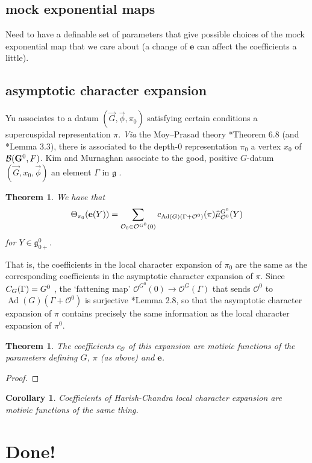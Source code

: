 \documentclass[12pt]{amsart}
\newcommand{\bG}{\mathbf{G}}
\newcommand{\cO}{\mathcal{O}}
\newcommand{\fg}{\mathfrak{g}}
\newcommand{\Ad}{\operatorname{Ad}}
\newcommand{\mexp}{\mathbf{e}}
\def\cO{\mathcal{O}}
\theoremstyle{plain}
\newtheorem{theorem}[thm]{Theorem}
\newtheorem{cor}[thm]{Corollary}
\theoremstyle{definition}
\begin{document}
\subsection{mock exponential maps}
Need to have a definable set of parameters that give possible choices of the mock exponential map that we care about (a change of $\mexp$ can affect the coefficients a little). 

\subsection{asymptotic character expansion}
Yu \cite{yu:supercuspidal} associates to a datum
\((\vec G, \vec\phi, \pi_0)\) satisfying certain conditions
a supercuspidal representation \(\pi\).
\textit{Via} the Moy--Prasad theory
\cite{moy-prasad:jacquet}*{Theorem 6.8}
(and \cite{yu:supercuspidal}*{Lemma 3.3}), there is
associated to the depth-0 representation \(\pi_0\) a vertex
\(x_0\) of \(\BB(\bG^0, \field)\).
Kim and Murnaghan 
associate to the good, positive \(G\)-datum
\((\vec G, x_0, \vec\phi)\) 
an element \(\Gamma\) in \(\fg\) .
 
\begin{theorem}
We have that
\[
\Theta_{\pi_0}(\mexp(Y))
= \sum_{\cO_0 \in \cO^{G^0}(0)}
	c_{\Ad(G)(\Gamma + \cO^0)}(\pi)\muhat^{G^0}_{\cO^0}(Y)
\]
for \(Y \in \fg^0_{0+}\).
\end{theorem}


That is, the coefficients in the local character expansion
of \(\pi_0\) are the same as the corresponding coefficients
in the asymptotic character expansion of \(\pi\).
Since
\(C_G(\Gamma) = G^0\) \citeme,
the `fattening map'
\(\cO^{G^0}(0) \to \cO^G(\Gamma)\)
that sends \(\cO^0\) to \(\Ad(G)(\Gamma + \cO^0)\) is
surjective \cite{hc:queens}*{Lemma 2.8},
so that the asymptotic character expansion of
\(\pi\) contains precisely the same information as the local
character expansion of \(\pi^0\).
 

\begin{theorem} The coefficients $c_{\cO}$ of this expansion are motivic functions of the parameters defining $G$, $\pi$ (as above) and $\mexp$. 
\end{theorem}

\begin{proof}
\end{proof}



\begin{cor}
Coefficients of Harish-Chandra local character expansion are motivic functions of the same thing.
\end{cor}

\section{Done!}
\end{document}
